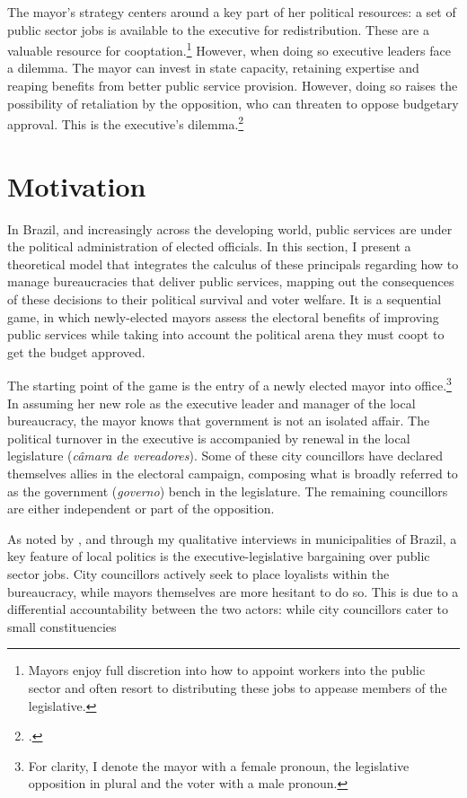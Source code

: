 \documentclass[12pt,]{book}
\let\rmarkdownfootnote\footnote%
\def\footnote{\protect\rmarkdownfootnote}
\begin{document}
The mayor's strategy centers around a key part of her political resources: a set of public sector jobs is available to the executive for redistribution. These are a valuable resource for cooptation.\footnote{Mayors enjoy full discretion into how to appoint workers into the public sector and often resort to distributing these jobs to appease members of the legislative.} However, when doing so executive leaders face a dilemma. The mayor can invest in state capacity, retaining expertise and reaping benefits from better public service provision. However, doing so raises the possibility of retaliation by the opposition, who can threaten to oppose budgetary approval. This is the executive's dilemma.\footnote{\citet{geddes_politicians_1994}.}

\hypertarget{motivation}{%
\chapter{Motivation}\label{motivation}}

In Brazil, and increasingly across the developing world, public services are under the political administration of elected officials. In this section, I present a theoretical model that integrates the calculus of these principals regarding how to manage bureaucracies that deliver public services, mapping out the consequences of these decisions to their political survival and voter welfare. It is a sequential game, in which newly-elected mayors assess the electoral benefits of improving public services while taking into account the political arena they must coopt to get the budget approved.

The starting point of the game is the entry of a newly elected mayor into office.\footnote{For clarity, I denote the mayor with a female pronoun, the legislative opposition in plural and the voter with a male pronoun.} In assuming her new role as the executive leader and manager of the local bureaucracy, the mayor knows that government is not an isolated affair. The political turnover in the executive is accompanied by renewal in the local legislature (\emph{câmara de vereadores}). Some of these city councillors have declared themselves allies in the electoral campaign, composing what is broadly referred to as the government (\emph{governo}) bench in the legislature. The remaining councillors are either independent or part of the opposition.

As noted by \citet{couto_governando_1995}, and through my qualitative interviews in municipalities of Brazil, a key feature of local politics is the executive-legislative bargaining over public sector jobs. City councillors actively seek to place loyalists within the bureaucracy, while mayors themselves are more hesitant to do so. This is due to a differential accountability between the two actors: while city councillors cater to small constituencies
\end{document}
